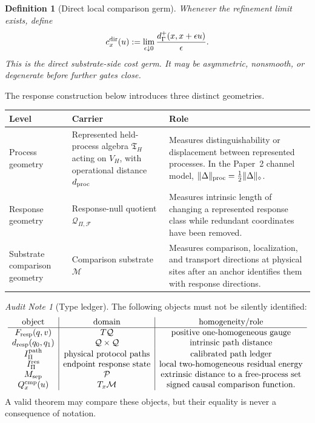 \documentclass[11pt]{article}
\newtheorem{definition}[theorem]{Definition}
\theoremstyle{remark}
\newtheorem{audit}[theorem]{Audit Note}
\newcommand{\G}{\Gamma}
\newcommand{\Mgeom}{\mathcal M}
\newcommand{\Pproc}{\mathcal P}
\newcommand{\Qresp}{\mathcal Q}
\newcommand{\Fresp}{F_{\rm resp}}
\newcommand{\dresp}{d_{\rm resp}}
\newcommand{\dproc}{d_{\rm proc}}
\newcommand{\Qcmp}{Q^{\rm cmp}}
\newcommand{\VH}{V_H}
\newcommand{\Tproc}{\mathfrak T_H}
\begin{document}
\begin{definition}[Direct local comparison germ]
Whenever the refinement limit exists, define
\[
        c_x^{\rm dir}(u)
        :=
        \lim_{\epsilon\downarrow0}
        \frac{d^+_\G(x,x+\epsilon u)}{\epsilon}.
\]
This is the direct substrate-side cost germ.  It may be asymmetric, nonsmooth, or degenerate before further gates close.
\end{definition}

The response construction below introduces three distinct geometries.

\begin{longtable}{p{}p{}p{}}
\toprule
Level & Carrier & Role \\
\midrule
Process geometry & Represented held-process algebra $\Tproc$ acting on $\VH$, with operational distance $\dproc$ & Measures distinguishability or displacement between represented processes.  In the Paper~2 channel model, $\|\Delta\|_{\rm proc}=\tfrac12\|\Delta\|_\diamond$. \\
Response geometry & Response-null quotient $\Qresp_{\Pi,\mathcal F}$ & Measures intrinsic length of changing a represented response class while redundant coordinates have been removed. \\
Substrate comparison geometry & Comparison substrate $\Mgeom$ & Measures comparison, localization, and transport directions at physical sites after an anchor identifies them with response directions. \\
\bottomrule
\end{longtable}

\begin{audit}[Type ledger]
The following objects must not be silently identified:
\[
\begin{array}{c|c|c}
\text{object} & \text{domain} & \text{homogeneity/role}\\ \hline
\Fresp(q,v) & T\Qresp & \text{positive one-homogeneous gauge}\\
\dresp(q_0,q_1) & \Qresp\times\Qresp & \text{intrinsic path distance}\\
I_\Pi^{\rm path} & \text{physical protocol paths} & \text{calibrated path ledger}\\
I_\Pi^{\rm res} & \text{endpoint response state} & \text{local two-homogeneous residual energy}\\
M_{\rm sep} & \Pproc & \text{extrinsic distance to a free-process set}\\
\Qcmp_x(u) & T_x\Mgeom & \text{signed causal comparison function}.
\end{array}
\]
A valid theorem may compare these objects, but their equality is never a consequence of notation.
\end{audit}
\end{document}
